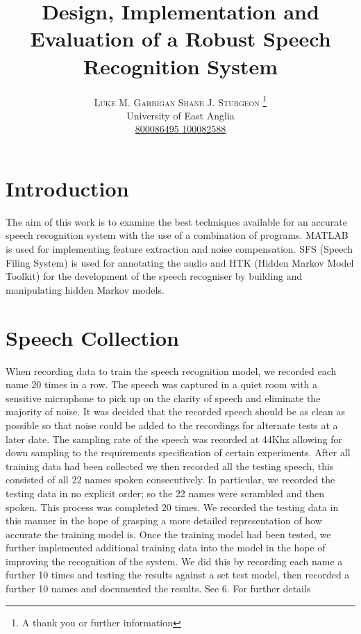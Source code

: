 \documentclass[twoside,twocolumn]{article}
\title{Design, Implementation and Evaluation of a Robust Speech Recognition System} %
\author{%
\textsc{Luke M. Garrigan   Shane J. Sturgeon }
\thanks{A thank you or further information} 
\\[1ex] %
\normalsize University of East Anglia \\ %
\normalsize \href{mailto:john@smith.com}{800086495   100082588    } %
}
\begin{document}
\maketitle


\section{Introduction}

The aim of this work is to examine the best techniques available for an accurate speech recognition system with the use of a combination of programs. MATLAB is used  for implementing feature extraction and noise compensation. SFS (Speech Filing System) is used for annotating the audio and HTK (Hidden Markov Model Toolkit) for the development of the speech recogniser by building and manipulating hidden Markov models.


\section{Speech Collection}
When recording data to train the speech recognition model, we recorded each name 20 times in a row. The speech was captured in a quiet room with a sensitive microphone to pick up on the clarity of speech and eliminate the majority of noise. It was decided that the recorded speech should be as clean as possible so that noise could be added to the recordings for alternate tests  at a later date.
The sampling rate of the speech was recorded at  44Khz allowing for down sampling to the requirements specification of certain experiments. After all training data had been collected we then recorded all the testing speech, this consisted of all 22 names spoken consecutively. In particular, we recorded the testing data in no explicit order; so the 22 names were scrambled and then spoken. This process was completed 20 times. We recorded the testing data in this manner in the hope of grasping a more detailed representation of how accurate the training model is.
Once the training model had been tested, we further implemented additional training data  into the model in the hope of improving the recognition of the system. We did this by recording each name a further 10 times and testing the results against a set test model, then recorded a further 10 names and documented the results. See 6. For further details
\end{document}
